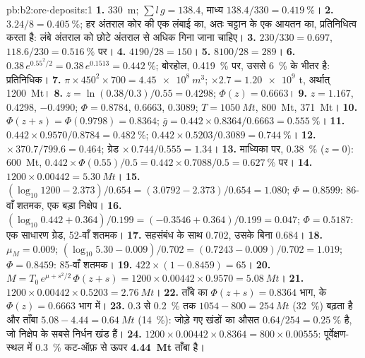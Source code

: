\begin{solution}{pb:b2:ore-deposits:1}
\textbf{1.} \qty{330}{m}; $\sum l\,g = 138.4$, माध्य $138.4/330 = \qty{0.419}{\percent}$।
\textbf{2.} $3.24/8 = \qty{0.405}{\percent}$; हर अंतराल कोर की एक लंबाई का, अतः चट्टान के एक आयतन का,
प्रतिनिधित्व करता है: लंबे अंतराल को छोटे अंतराल से अधिक गिना जाना चाहिए।
\textbf{3.} $230/330 = 0.697$, $118.6/230 = \qty{0.516}{\percent}$ पर।
\textbf{4.} $4190/28 = 150$।
\textbf{5.} $8100/28 = 289$।
\textbf{6.} $0.38\,e^{0.55^2/2} = 0.38\,e^{0.1513} = \qty{0.442}{\percent}$; बोरहोल,
\qty{0.419}{\percent} पर, उससे \qty{6}{\percent} के भीतर है: प्रतिनिधिक।
\textbf{7.} $\pi \times 450^2 \times 700 = \qty{4.45e8}{m^3}$; $\times 2.7 = \num{1.20e9}$ t,
अर्थात् \qty{1200}{Mt}।
\textbf{8.} $z = \ln(0.38/0.3)/0.55 = 0.4298$; $\Phi(z) = 0.6663$।
\textbf{9.} $z = 1.167$, 0.4298, $-0.4990$; $\Phi = 0.8784$, 0.6663, 0.3089; $T = \qty{1050}{Mt}$,
\qty{800}{Mt}, \qty{371}{Mt}।
\textbf{10.} $\Phi(z + s) = \Phi(0.9798) = 0.8364$; $\bar g = 0.442 \times 0.8364/0.6663 =
\qty{0.555}{\percent}$।
\textbf{11.} $0.442 \times 0.9570/0.8784 = \qty{0.482}{\percent}$; $0.442 \times 0.5203/0.3089 =
\qty{0.744}{\percent}$।
\textbf{12.}  $\times\, 370.7/799.6 = 0.464$; ग्रेड $\times\, 0.744/0.555 = 1.34$।
\textbf{13.} माध्यिका पर, \qty{0.38}{\percent} ($z = 0$): \qty{600}{Mt}, $0.442 \times
\Phi(0.55)/0.5 = 0.442 \times 0.7088/0.5 = \qty{0.627}{\percent}$ पर।
\textbf{14.} $1200 \times 0.00442 = \qty{5.30}{Mt}$।
\textbf{15.} $(\log_{10} 1200 - 2.373)/0.654 = (3.0792 - 2.373)/0.654 = 1.080$; $\Phi = 0.8599$: 86-वाँ
शतमक, एक बड़ा निक्षेप।
\textbf{16.} $(\log_{10} 0.442 + 0.364)/0.199 = (-0.3546 + 0.364)/0.199 = 0.047$; $\Phi = 0.5187$: एक
साधारण ग्रेड, 52-वाँ शतमक।
\textbf{17.} सहसंबंध के साथ 0.702, उसके बिना 0.684।
\textbf{18.} $\mu_M = 0.009$; $(\log_{10} 5.30 - 0.009)/0.702 = (0.7243 - 0.009)/0.702 = 1.019$; $\Phi =
0.8459$: 85-वाँ शतमक।
\textbf{19.} $422 \times (1 - 0.8459) = 65$।
\textbf{20.} $M = T_0\,e^{\mu + s^2/2}\,\Phi(z + s) = 1200 \times 0.00442 \times 0.9570 =
\qty{5.08}{Mt}$।
\textbf{21.} $1200 \times 0.00442 \times 0.5203 = \qty{2.76}{Mt}$।
\textbf{22.} ताँबे का $\Phi(z + s) = 0.8364$ भाग,  के $\Phi(z) = 0.6663$ भाग में।
\textbf{23.} 0.3 से \qty{0.2}{\percent} तक  $1054 - 800 = \qty{254}{Mt}$
(\qty{32}{\percent}) बढ़ता है और ताँबा $5.08 - 4.44 = \qty{0.64}{Mt}$ (\qty{14}{\percent}): जोड़े गए
खंडों का औसत $0.64/254 = \qty{0.25}{\percent}$ है, जो निक्षेप के सबसे निर्धन खंड हैं।
\textbf{24.} $1200 \times 0.00442 \times 0.8364 = 800 \times 0.00555$: पूर्वेक्षण-स्थल में \qty{0.3}{\percent}
कट-ऑफ़ से ऊपर \textbf{\qty[text-series-to-math=true]{4.44}{Mt}} ताँबा है।
\end{solution}
